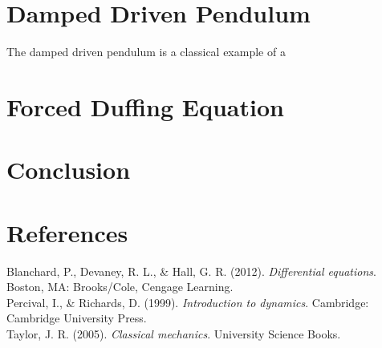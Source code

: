 \documentclass{paper}
\begin{document}
\section{Damped Driven Pendulum}
The damped driven pendulum is a classical example of a 
\section{Forced Duffing Equation}
\section{Conclusion}
\newpage
\section{References}
Blanchard, P., Devaney, R. L., \& Hall, G. R. (2012). \textit{Differential equations}. Boston, MA: Brooks/Cole, Cengage Learning.\\
Percival, I., \& Richards, D. (1999). \textit{Introduction to dynamics}. Cambridge: Cambridge University Press. \\
Taylor, J. R. (2005). \textit{Classical mechanics}. University Science Books.
\end{document}
